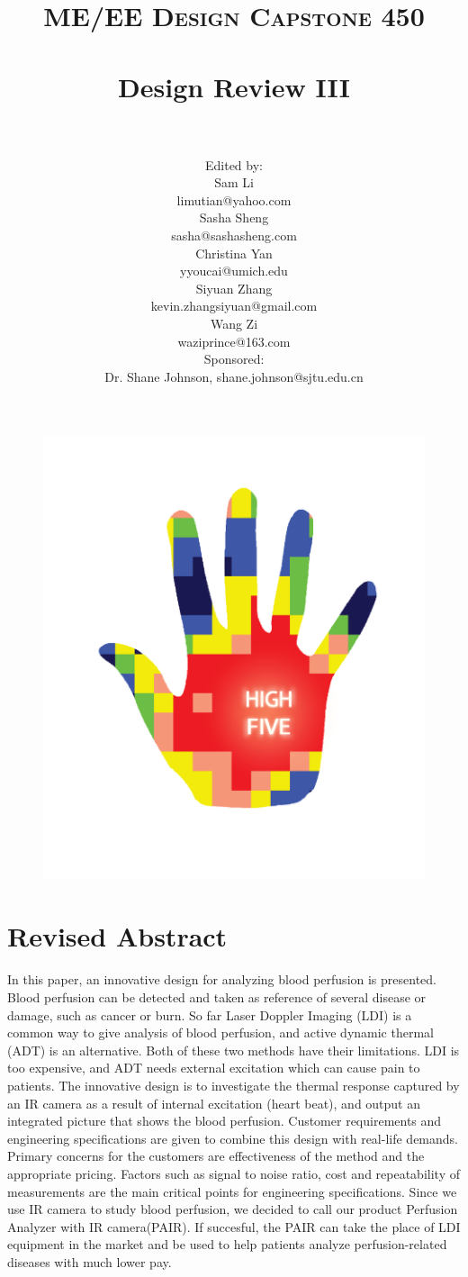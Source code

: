 \documentclass[paper=letter, fontsize=11pt]{scrartcl}
\title{
		\vspace{-1in} 	
		\usefont{OT1}{bch}{b}{n}
		\normalfont \normalsize \textsc{ME/EE Design Capstone 450} \\ [25pt]
		\horrule{0.5pt} \\[0.4cm]
		\huge Design Review III\\
		\horrule{2pt} \\[0.5cm]
}
\author{
        \normalfont 							
        \normalsize
        Edited by: \\
        Sam Li \\ limutian@yahoo.com \\[2pt]
        Sasha Sheng \\ sasha@sashasheng.com\\[2pt]
        Christina Yan \\ yyoucai@umich.edu\\[2pt]
        Siyuan Zhang\\ kevin.zhangsiyuan@gmail.com\\[2pt]
        Wang Zi \\ waziprince@163.com\\ [2pt]
         Sponsored: \\ Dr. Shane Johnson,  shane.johnson@sjtu.edu.cn\\ \vspace{0.5cm}
}
\numberwithin{equation}{section}		%
\numberwithin{figure}{section}			%
\numberwithin{table}{section}			%
\begin{document}
\maketitle
\begin{figure}[H]
    \centering
    \includegraphics[scale=0.7]{LOGO.png}
\end{figure}
\pagebreak
\tableofcontents
\pagebreak
	
\section{Revised Abstract}	
In this paper, an innovative design for analyzing blood perfusion is presented. Blood perfusion can be detected and
taken as reference of several disease or damage, such as cancer or burn. So far Laser Doppler Imaging (LDI) is a 
common way to give analysis of blood perfusion, and active dynamic thermal (ADT) is an alternative. Both of 
these two methods have their 
limitations. LDI is too expensive, and ADT needs external excitation which can cause pain to patients. The innovative design is to 
investigate the thermal response captured by an IR camera as a result of internal excitation (heart beat), and output an 
integrated picture that shows the blood perfusion. Customer requirements and engineering 
specifications are given to combine this design with real-life demands. Primary concerns for the customers are effectiveness
of the method and the appropriate pricing. Factors such as signal to noise ratio, cost and repeatability of measurements are the
main critical points for engineering specifications. Since we use IR camera to study blood perfusion, we decided to call our product 
Perfusion Analyzer with IR camera(PAIR). If succesful, the PAIR can take the place of LDI equipment in the market and be used to
help patients analyze perfusion-related diseases with much lower pay.
\end{document}
